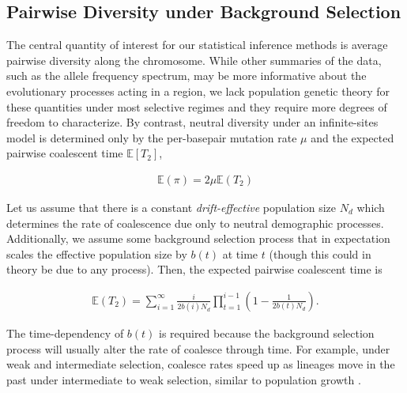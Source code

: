 \documentclass[11pt]{article}
\newcommand{\E}{\mathbb{E}}
\begin{document}
\subsection*{Pairwise Diversity under Background Selection}

The central quantity of interest for our statistical inference methods is
average pairwise diversity along the chromosome. While other summaries of the
data, such as the allele frequency spectrum, may be more informative about the
evolutionary processes acting in a region, we lack population genetic theory
for these quantities under most selective regimes and they require more degrees
of freedom to characterize. By contrast, neutral diversity under an
infinite-sites model is determined only by the per-basepair mutation rate $\mu$
and the expected pairwise coalescent time $\E[T_2]$,

\begin{align}
  \E(\pi) = 2 \mu \E(T_2)
\end{align}

Let us assume that there is a constant \emph{drift-effective} population size
$N_d$ which determines the rate of coalescence due only to neutral demographic
processes. Additionally, we assume some background selection process that in
expectation scales the effective population size by $b(t)$ at time $t$ (though
this could in theory be due to any process). Then, the expected pairwise
coalescent time is

\begin{align}
  \label{eq:T_2}
  \E(T_2) = \sum_{i=1}^\infty \frac{i}{2 b(i) N_d}\prod_{t=1}^{i-1} \left(1-\frac{1}{2 b(t) N_d}\right).
\end{align}

The time-dependency of $b(t)$ is required because the background selection
process will usually alter the rate of coalesce through time. For example,
under weak and intermediate selection, coalesce rates speed up as lineages move
in the past under intermediate to weak selection, similar to population growth
\parencite{Walczak2012-fi,Seger2010-rs,Good2014-yz}. 

\end{document}
